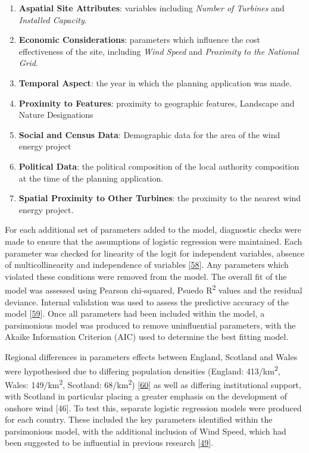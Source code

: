 \documentclass[a4paper,]{article}
\providecommand{\tightlist}{%
  \setlength{\itemsep}{0pt}\setlength{\parskip}{0pt}}
\theoremstyle{definition}
\theoremstyle{definition}
\theoremstyle{definition}
\theoremstyle{remark}
\begin{document}
\begin{enumerate}
\def\labelenumi{\arabic{enumi}.}
\tightlist
\item
  \textbf{Aspatial Site Attributes}: variables including \emph{Number of
  Turbines} and \emph{Installed Capacity}.
\item
  \textbf{Economic Considerations}: parameters which influence the cost
  effectiveness of the site, including \emph{Wind Speed} and
  \emph{Proximity to the National Grid}.
\item
  \textbf{Temporal Aspect}: the year in which the planning application
  was made.
\item
  \textbf{Proximity to Features}: proximity to geographic features,
  Landscape and Nature Designations
\item
  \textbf{Social and Census Data}: Demographic data for the area of the
  wind energy project
\item
  \textbf{Political Data}: the political composition of the local
  authority composition at the time of the planning application.
\item
  \textbf{Spatial Proximity to Other Turbines}: the proximity to the
  nearest wind energy project.
\end{enumerate}

For each additional set of parameters added to the model, diagnostic
checks were made to ensure that the assumptions of logistic regression
were maintained. Each parameter was checked for linearity of the logit
for independent variables, absence of multicollinearity and independence
of variables {[}\protect\hyperlink{ref-Harrell2001}{58}{]}. Any
parameters which violated these conditions were removed from the model.
The overall fit of the model was assessed using Pearson chi-squared,
Psuedo R\textsuperscript{2} values and the residual deviance. Internal
validation was used to assess the predictive accuracy of the model
{[}\protect\hyperlink{ref-Hosmer2004}{59}{]}. Once all parameters had
been included within the model, a parsimonious model was produced to
remove uninfluential parameters, with the Akaike Information Criterion
(AIC) used to determine the best fitting model.

Regional differences in parameters effects between England, Scotland and
Wales were hypothesised due to differing population densities (England:
413/km\textsuperscript{2}, Wales: 149/km\textsuperscript{2}, Scotland:
68/km\textsuperscript{2}) {[}\protect\hyperlink{ref-ONS2013}{60}{]} as
well as differing institutional support, with Scotland in particular
placing a greater emphasis on the development of onshore wind {[}46{]}.
To test this, separate logistic regression models were produced for each
country. These included the key parameters identified within the
parsimonious model, with the additional inclusion of Wind Speed, which
had been suggested to be influential in previous research
{[}\protect\hyperlink{ref-VanRensburg20}{49}{]}.
\end{document}
